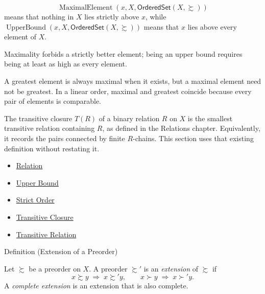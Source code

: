 \begin{remark*}
\[
  \operatorname{MaximalElement}(x,X,\mathsf{OrderedSet}(X,\succsim))
\] means that
nothing in $X$ lies strictly above $x$, while
$\operatorname{UpperBound}(x,X,\mathsf{OrderedSet}(X,\succsim))$ means that
$x$ lies above every element of $X$.
\end{remark*}

\begin{remark*}[Interpretation]
Maximality forbids a strictly better element; being an upper bound requires
being at least as high as every element.
\end{remark*}

\begin{remark*}[Exposition]
A greatest element is always maximal when it exists, but a maximal element need
not be greatest. In a linear order, maximal and greatest coincide because every
pair of elements is comparable.
\end{remark*}

\begin{remark*}[Exposition]
The transitive closure $T(R)$ of a binary relation $R$ on $X$ is the smallest
transitive relation containing $R$, as defined in the Relations chapter.
Equivalently, it records the pairs connected by finite $R$-chains. This
section uses that existing definition without restating it.
\end{remark*}

\begin{dependencies}
\begin{itemize}
  \item \hyperref[def:relation]{Relation}
  \item \hyperref[def:upper-bound]{Upper Bound}
  \item \hyperref[def:strict-order]{Strict Order}
  \item \hyperref[def:relation-transitive-closure]{Transitive Closure}
  \item \hyperref[def:transitive]{Transitive Relation}
\end{itemize}
\end{dependencies}


\begin{definitionbox}{Definition (Extension of a Preorder)}
\begin{definition}\label{def:preorder-extension}
Let $\succsim$ be a preorder on $X$. A preorder $\succsim'$ is an
\emph{extension} of $\succsim$ if
\[
  x \succsim y \;\Rightarrow\; x \succsim' y,
  \qquad
  x \succ y \;\Rightarrow\; x \succ' y.
\]
A \emph{complete extension} is an extension that is also complete.
\end{definition}
\end{definitionbox}

